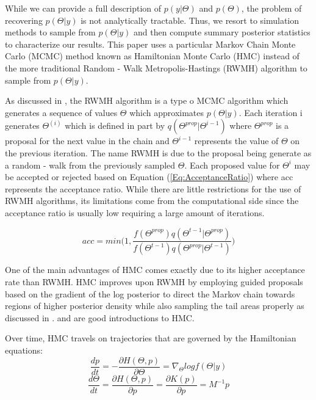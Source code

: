 \documentclass{article}
\begin{document}
While we can provide a full description of $p(y|\Theta)$ and $p(\Theta)$, the problem of recovering $p(\Theta|y)$ is not analytically tractable. Thus, we resort to simulation methods to sample from $p(\Theta|y)$ and then compute summary posterior statistics to characterize our results. This paper uses a particular Markov Chain Monte Carlo (MCMC) method known as Hamiltonian Monte Carlo (HMC) instead of the more traditional Random - Walk Metropolis-Hastings (RWMH) algorithm to sample from $p(\Theta|y)$. 

As discussed in \cite{gamerman2006markov}, the RWMH algorithm is a type o MCMC algorithm which generates a sequence of values $\Theta$ which approximates  $p(\Theta|y)$. Each iteration i generates $\Theta^{(i)}$ which is defined in part by $q(\Theta^{prop}|\Theta^{i-1})$ where $\Theta^{prop}$ is a proposal for the next value in the chain and $\Theta^{i-1}$ represents the value of $\Theta$ on the previous iteration. The name RWMH is due to the proposal being generate as a random - walk from the previously sampled $\Theta$. Each proposed value for $\Theta^{i}$ may be accepted or rejected based on Equation (\ref{Eq:AcceptanceRatio}) where acc represents the acceptance ratio. While there are little restrictions for the use of RWMH algorithms, its limitations come from the computational side since the acceptance ratio is usually low requiring a large amount of iterations.

\begin{equation}\label{Eq:AcceptanceRatio}
   acc = min \Bigg(1, \frac{f(\Theta^{prop}) q(\Theta^{t-1}|\Theta^{prop}) }{f(\Theta^{t-1}) q(\Theta^{prop}|\Theta^{t-1}) } \Bigg)  
\end{equation}

One of the main advantages of HMC comes exactly due to its higher acceptance rate than RWMH. HMC improves upon RWMH by employing guided proposals based on the gradient of the log posterior to direct the Markov chain towards regions of higher posterior density while also sampling the tail areas properly as discussed in \cite{betancourt2017conceptual}. \cite{thomas2021learning} and \cite{betancourt2017conceptual} are good introductions to HMC. 

Over time, HMC travels on trajectories that are governed by the Hamiltonian equations: 
$$ \frac{dp}{dt} = - \frac{\partial H(\Theta, p)}{\partial \Theta} = \nabla_{\Theta} log f(\Theta|y)$$
$$ \frac{d\Theta}{dt} = \frac{\partial H(\Theta, p)}{\partial p} = \frac{\partial K(p)}{\partial p} = M^{-1}p $$
\end{document}
